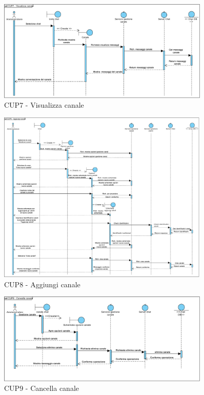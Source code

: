 \begin{figure}
	\centering
	\includegraphics[width=0.9\textwidth]{imgs/gruppo6/sequence/CUP7_visualizza_canale.pdf}
	\caption{CUP7 - Visualizza canale}
	\label{fig:seq-cup7}
\end{figure}

\begin{figure}
	\centering
	\includegraphics[width=0.9\textwidth]{imgs/gruppo6/sequence/CUP8_aggiungi_canale.pdf}
	\caption{CUP8 - Aggiungi canale}
	\label{fig:seq-cup8}
\end{figure}

\begin{figure}
	\centering
	\includegraphics[width=0.9\textwidth]{imgs/gruppo6/sequence/CUP9_cancella_canale.pdf}
	\caption{CUP9 - Cancella canale}
	\label{fig:seq-cup9}
\end{figure}

